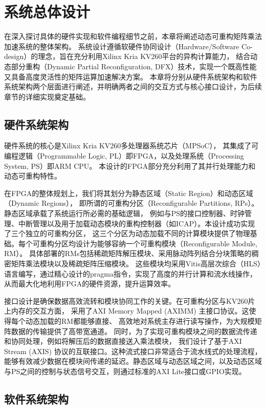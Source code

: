 \chapter{系统总体设计}

在深入探讨具体的硬件实现和软件编程细节之前，本章将阐述动态可重构矩阵乘法加速系统的整体架构。
系统设计遵循软硬件协同设计（Hardware/Software Co-design）的理念，旨在充分利用Xilinx Kria KV260平台的异构计算能力，
结合动态部分重构（Dynamic Partial Reconfiguration, DFX）技术，实现一个既高性能又具备高度灵活性的矩阵运算加速解决方案。
本章将分别从硬件系统架构和软件系统架构两个层面进行阐述，并明确两者之间的交互方式与核心接口设计，为后续章节的详细实现奠定基础。

\section{硬件系统架构}

硬件系统的核心是Xilinx Kria KV260多处理器系统芯片（MPSoC），
其集成了可编程逻辑（Programmable Logic, PL）即FPGA，以及处理系统（Processing System, PS）即ARM CPU。
本设计的FPGA部分充分利用了其并行处理能力和动态可重构特性。

在FPGA的整体规划上，我们将其划分为静态区域（Static Region）和动态区域（Dynamic Regions），
即所谓的可重构分区（Reconfigurable Partitions, RPs）。静态区域承载了系统运行所必需的基础逻辑，
例如与PS的接口控制器、时钟管理、中断管理以及用于加载动态模块的重构控制器（如ICAP）。本设计成功实现了三个独立的可重构分区，
这三个分区为动态加载不同的计算模块提供了物理基础。每个可重构分区均设计为能够容纳一个可重构模块（Reconfigurable Module, RM）。
具体部署的RMs包括稀疏矩阵解压模块、采用脉动阵列结合分块策略的稠密矩阵乘法模块以及稀疏矩阵压缩模块。
这些模块均采用Vitis高层次综合（HLS）语言编写，通过精心设计的pragma指令，实现了高度的并行计算和流水线操作，从而最大化地利用FPGA的硬件资源，提升运算效率。

接口设计是确保数据高效流转和模块协同工作的关键。在可重构分区与KV260片上内存的交互方面，
采用了AXI Memory Mapped (AXIMM) 主接口协议。这使得每个动态加载的RM都能够直接、
高效地对系统主存进行读写操作，为大规模矩阵数据的传输提供了高带宽通道。
同时，为了实现可重构模块之间的数据流传递和协同处理，例如将解压后的数据直接送入乘法模块，
我们设计了基于AXI Stream (AXIS) 协议的互联接口。这种流式接口非常适合于流水线式的处理流程，
能够有效减少数据在模块间传递的延迟。静态区域与动态区域之间，以及动态区域与PS之间的控制与状态信号交互，则通过标准的AXI Lite接口或GPIO实现。

\section{软件系统架构}

